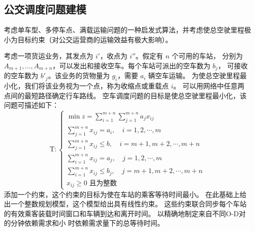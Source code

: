 

\subsection{公交调度问题建模}
考虑单车型、多停车点、满载运输问题的一种启发式算法，并考虑使总空驶里程极
小为目标约束（对公交运营商的运输效益有极大影响）。

考虑一项货运业务，其发点为 $i'$，收点为 $i''$。假定有 $n$ 个可用的车站，
分别为 $A_{m+1}, \ldots, A_{m+n}$，可以发出和接收空车。每个车站可派出的空车数为 $b_j$，
可接收的空车数为 $b'_j$。该业务的货物量为 $g_i$，需要 $a_i$ 辆空车运输。
为使总空驶里程最小化，我们将该业务视为一个点，称为收缩点或重载点 $i$。
可以用网络中任意两点间的最短路径确定行车路线。
空车调度问题的目标是使总空驶里程最小化，该问题可描述如下：
$$
\mathrm{T}:
\begin{cases}
    \min z=\sum_{i=1}^{m+n} \sum_{j=1}^{m+n} a_{j} x_{i j}\\
    \sum_{j=1}^{m+n} x_{i j}=a_{i}, \quad i=1,2, \cdots, m \\
    \sum_{j=1}^{m+n} x_{i j} \leqslant b, \quad i=m+1, m+2, \cdots, m+n \\
    \sum_{i=1}^{m+n} x_{i j}=a_{j}, \quad j=1,2, \cdots, m \\
    \sum_{i=1}^{m+n} x_{i j} \leqslant b_{j}, \quad j=m+1, m+2, \cdots, m+n\\
    x_{i j} \geqslant 0 \text { 且为整数 }
\end{cases}
$$
添加一个约束，这个约束的目标为使在车站的乘客等待时间最小。
在此基础上给出一个整数规划模型，这个模型给出具有线性约束。
这些约束联合同步每个车站的有效乘客装载时间窗口和车辆到达和离开时间。
以精确地制定来自不同O-D对的分钟依赖需求和小
时依赖需求量下的总等待时间。

